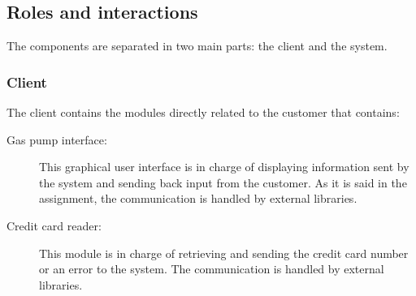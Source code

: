 \documentclass[a4paper, 11pt]{article}
\begin{document}

    \subsection{Roles and interactions}

    The components are separated in two main parts: the client and the system.

    \subsubsection{Client}

    The client contains the modules directly related to the
    customer that contains:

    \begin{description}
        \item[Gas pump interface:] This graphical user interface is in charge of
        displaying information sent by the system and sending back input from
        the customer. As it is said in the assignment, the communication is
        handled by external libraries.
        \item[Credit card reader:] This module is in charge of retrieving and
        sending the credit card number or an error to the system. The
        communication is handled by external libraries.
    \end{description}
\end{document}

